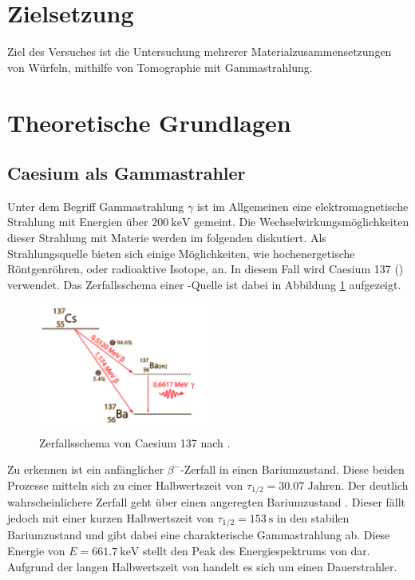 \section{Zielsetzung}
Ziel des Versuches ist die Untersuchung mehrerer Materialzusammensetzungen von Würfeln, mithilfe von Tomographie mit Gammastrahlung.

\section{Theoretische Grundlagen}

\subsection{Caesium als Gammastrahler}
Unter dem Begriff Gammastrahlung $\gamma$ ist im Allgemeinen eine elektromagnetische Strahlung mit Energien über $\SI{200}{\kilo\electronvolt}$ gemeint. 
Die Wechselwirkungsmöglichkeiten dieser Strahlung mit Materie werden im folgenden diskutiert. Als Strahlungsquelle bieten sich einige Möglichkeiten, wie hochenergetische Röntgenröhren, oder radioaktive Isotope, an. 
In diesem Fall wird Caesium 137 () verwendet. Das Zerfallsschema einer -Quelle ist dabei in Abbildung \ref{fig:decay} aufgezeigt.
\begin{figure}
    \centering
    \includegraphics[width=0.5\textwidth]{bilder/decay.png}
    \caption{Zerfallsschema von Caesium 137 nach \cite{decay}.}
    \label{fig:decay}
\end{figure}
Zu erkennen ist ein anfänglicher $\beta^{-}$-Zerfall in einen Bariumzustand. 
Diese beiden Prozesse mitteln sich zu einer Halbwertszeit von $\tau_{1\text{/}2} = 30.07 \text{ Jahren}$. Der deutlich wahrscheinlichere Zerfall geht über einen angeregten Bariumzustand . 
Dieser fällt jedoch mit einer kurzen Halbwertszeit von $\tau_{1\text{/}2} = \SI{153}{\second}$ in den stabilen Bariumzustand und gibt dabei eine charakterische Gammastrahlung ab. 
Diese Energie von $E = \SI{661.7}{\kilo\electronvolt}$ stellt den Peak des Energiespektrums von  dar. Aufgrund der langen Halbwertszeit von  handelt es sich um einen Dauerstrahler.
